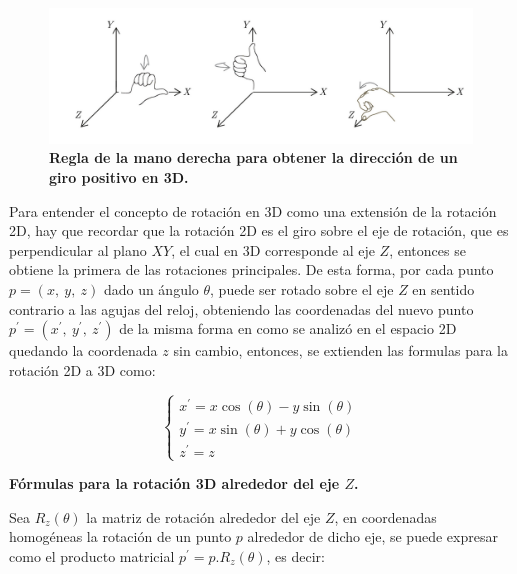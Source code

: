\begin{figure}[h]
\includegraphics[width=14cm]{Img/GEO/geo-mano0.jpg}
\centering
\caption{\textbf{\footnotesize{Regla de la mano derecha para obtener la dirección de un giro positivo en 3D.}}}
\label{img:mano}
\end{figure}

Para entender el concepto de rotación en 3D como una extensión de la rotación 2D, hay que recordar que la rotación 2D es el giro sobre el eje de rotación, que es perpendicular al plano $XY$, el cual en 3D corresponde al eje $Z$, entonces se obtiene la primera de las rotaciones principales.
De esta forma, por cada punto
$p = (x,\ y,\ z)$ dado un ángulo $\theta$, puede ser rotado sobre el eje $Z$ en sentido contrario a las agujas del reloj, obteniendo las coordenadas del nuevo punto $p^{\prime} = ({x}^{\prime},\ {y}^{\prime},\ {z}^{\prime})$ de la misma forma en como se analizó en el espacio 2D quedando la coordenada $z$ sin cambio, entonces, se extienden las formulas para la rotación 2D a 3D como: 

\begin{equation}\label{eq:giro2d}
\begin{cases}
{x}^{\prime} = x \cos(\theta) -y \sin(\theta) \\ 
{y}^{\prime} = x \sin(\theta) +y \cos(\theta) \\
{z}^{\prime} = z
\end{cases}
\end{equation}

\begin{center}
\textbf{\footnotesize{Fórmulas para la rotación 3D alrededor del eje $Z$.}}
\end{center}

Sea $R_{z}(\theta)$ la matriz de rotación alrededor del eje $Z$, en coordenadas homogéneas la rotación de un punto $p$ alrededor de dicho eje, se puede expresar como el producto matricial
$p^{\prime} = p.R_{z}(\theta)$, es decir:



